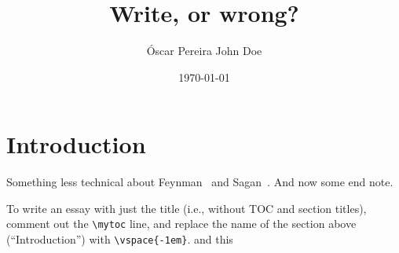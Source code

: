 \documentclass[a4paper,12pt,dvipsnames*]{article}
\title{
Write, or wrong?
}
\author{
Óscar Pereira\fn{\texttt{\{https://, oscar@\}randomwalk.eu}.} \hspace{2em} John Doe\fn{foobar}
}
\date{{\small\today}\vspace{-2em}}
\begin{document}
\maketitle

\mytoc

\section{Introduction}
  \label{sec:intro}
  Something less technical about Feynman~\cite{Feynman74} and Sagan~\cite{Sagan}. And now some end note.

  To write an essay with just the title (i.e., without TOC and section titles), comment out the \verb+\mytoc+ line, and replace the name of the section above (``Introduction'') with \verb+\vspace{-1em}+. and this

\iffootnotesonly
\else
  \printendnotes
\fi

{}


\end{document}
